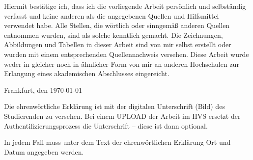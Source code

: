 %
%


Hiermit bestätige ich, dass ich die vorliegende Arbeit persönlich und selbständig verfasst und keine anderen als die angegebenen Quellen und Hilfsmittel verwendet habe. Alle Stellen, die wörtlich oder sinngemäß anderen Quellen entnommen wurden, sind als solche kenntlich gemacht. Die Zeichnungen, Abbildungen und Tabellen in dieser Arbeit sind von mir selbst erstellt oder wurden mit einem entsprechenden Quellennachweis versehen. Diese Arbeit wurde weder in gleicher noch in ähnlicher Form von mir an anderen Hochschulen zur Erlangung eines akademischen Abschlusses eingereicht.

\vspace{2cm}
Frankfurt, den \today \dotfill

\hspace{10cm} {\footnotesize \fullname}

\vspace{2cm}

Die ehrenwörtliche Erklärung ist mit der digitalen Unterschrift (Bild) des Studierenden zu versehen. Bei einem UPLOAD der Arbeit im HVS ersetzt der Authentifizierungsprozess die Unterschrift – diese ist dann optional.

In jedem Fall muss unter dem Text der ehrenwörtlichen Erklärung Ort und Datum angegeben werden.
